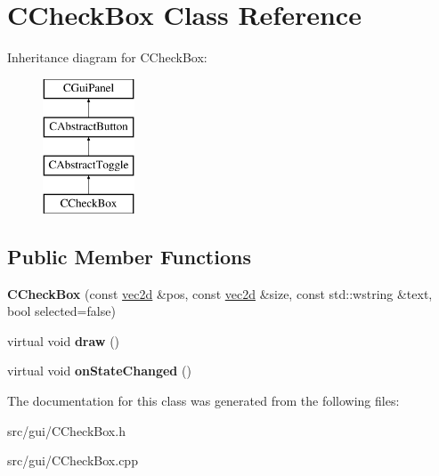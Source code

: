 \hypertarget{class_c_check_box}{
\section{CCheckBox Class Reference}
\label{class_c_check_box}
}
Inheritance diagram for CCheckBox:\begin{figure}[H]
\begin{center}
\leavevmode
\includegraphics[height=4.000000cm]{class_c_check_box}
\end{center}
\end{figure}
\subsection*{Public Member Functions}
\begin{DoxyCompactItemize}
\item 
\hypertarget{class_c_check_box_a21990bd8234ba49ca8f33ef23635e069}{
{\bfseries CCheckBox} (const \hyperlink{classvec2d}{vec2d} \&pos, const \hyperlink{classvec2d}{vec2d} \&size, const std::wstring \&text, bool selected=false)}
\label{class_c_check_box_a21990bd8234ba49ca8f33ef23635e069}

\item 
\hypertarget{class_c_check_box_a2352dc124cd865d4abdcc04e2a1c2a16}{
virtual void {\bfseries draw} ()}
\label{class_c_check_box_a2352dc124cd865d4abdcc04e2a1c2a16}

\item 
\hypertarget{class_c_check_box_a5b948b67b82f9db41249edb2201fa98a}{
virtual void {\bfseries onStateChanged} ()}
\label{class_c_check_box_a5b948b67b82f9db41249edb2201fa98a}

\end{DoxyCompactItemize}


The documentation for this class was generated from the following files:\begin{DoxyCompactItemize}
\item 
src/gui/CCheckBox.h\item 
src/gui/CCheckBox.cpp\end{DoxyCompactItemize}
